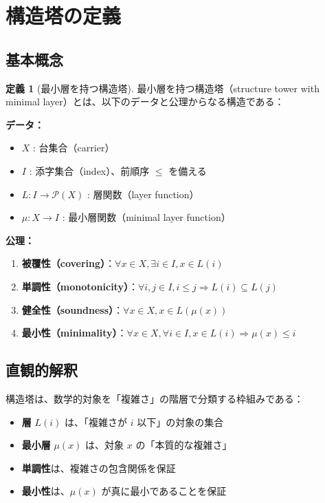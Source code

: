 \documentclass[a4paper,12pt]{ltjsarticle}
\theoremstyle{definition}
\newtheorem{definition}{定義}[section]
\begin{document}
\section{構造塔の定義}

\subsection{基本概念}

\begin{definition}[最小層を持つ構造塔]
\label{def:structure-tower}
最小層を持つ構造塔（structure tower with minimal layer）とは、以下のデータと公理からなる構造である：

\textbf{データ：}
\begin{itemize}
\item $X$ : 台集合（carrier）
\item $I$ : 添字集合（index）、前順序 $\leq$ を備える
\item $L : I \to \mathcal{P}(X)$ : 層関数（layer function）
\item $\mu : X \to I$ : 最小層関数（minimal layer function）
\end{itemize}

\textbf{公理：}
\begin{enumerate}
\item \textbf{被覆性（covering）}：$\forall x \in X, \exists i \in I, x \in L(i)$
\item \textbf{単調性（monotonicity）}：$\forall i, j \in I, i \leq j \Rightarrow L(i) \subseteq L(j)$
\item \textbf{健全性（soundness）}：$\forall x \in X, x \in L(\mu(x))$
\item \textbf{最小性（minimality）}：$\forall x \in X, \forall i \in I, x \in L(i) \Rightarrow \mu(x) \leq i$
\end{enumerate}
\end{definition}

\subsection{直観的解釈}

構造塔は、数学的対象を「複雑さ」の階層で分類する枠組みである：

\begin{itemize}
\item \textbf{層} $L(i)$ は、「複雑さが $i$ 以下」の対象の集合
\item \textbf{最小層} $\mu(x)$ は、対象 $x$ の「本質的な複雑さ」
\item \textbf{単調性}は、複雑さの包含関係を保証
\item \textbf{最小性}は、$\mu(x)$ が真に最小であることを保証
\end{itemize}
\end{document}

